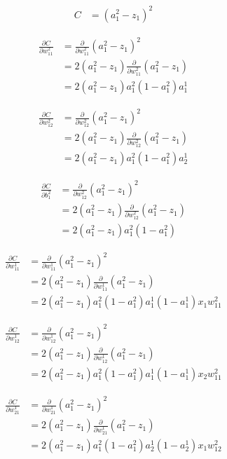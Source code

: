 \documentclass{article}
\begin{document}
\begin{align*}
C &= (a^2_1 - z_1)^2
\end{align*}

\begin{align*}
\frac{\partial C}{\partial w^2_{11}} &= \frac{\partial}{\partial w^2_{11}} (a^2_1 - z_1)^2\\
&= 2 (a^2_1 - z_1) \frac{\partial}{\partial w^2_{11}} (a^2_1 - z_1)\\
&= 2 (a^2_1 - z_1) a^2_1(1 - a^2_1)a^1_1
\end{align*}

\begin{align*}
\frac{\partial C}{\partial w^2_{12}} &= \frac{\partial}{\partial w^2_{12}} (a^2_1 - z_1)^2\\
&= 2 (a^2_1 - z_1) \frac{\partial}{\partial w^2_{12}} (a^2_1 - z_1)\\
&= 2 (a^2_1 - z_1) a^2_1(1 - a^2_1)a^1_2
\end{align*}

\begin{align*}
\frac{\partial C}{\partial b^2_{1}} &= \frac{\partial}{\partial w^2_{12}} (a^2_1 - z_1)^2\\
&= 2 (a^2_1 - z_1) \frac{\partial}{\partial w^2_{12}} (a^2_1 - z_1)\\
&= 2 (a^2_1 - z_1) a^2_1(1 - a^2_1)
\end{align*}

\begin{align*}
\frac{\partial C}{\partial w^1_{11}} &= \frac{\partial}{\partial w^1_{11}} (a^2_1 - z_1)^2\\
&= 2 (a^2_1 - z_1) \frac{\partial}{\partial w^1_{11}} (a^2_1 - z_1)\\
&= 2 (a^2_1 - z_1) a^2_1(1 - a^2_1)a^1_1(1 - a^1_1)x_1w^2_{11}
\end{align*}

\begin{align*}
\frac{\partial C}{\partial w^1_{12}} &= \frac{\partial}{\partial w^1_{12}} (a^2_1 - z_1)^2\\
&= 2 (a^2_1 - z_1) \frac{\partial}{\partial w^1_{12}} (a^2_1 - z_1)\\
&= 2 (a^2_1 - z_1) a^2_1(1 - a^2_1)a^1_1(1 - a^1_1)x_2w^2_{11}
\end{align*}

\begin{align*}
\frac{\partial C}{\partial w^1_{21}} &= \frac{\partial}{\partial w^1_{21}} (a^2_1 - z_1)^2\\
&= 2 (a^2_1 - z_1) \frac{\partial}{\partial w^1_{21}} (a^2_1 - z_1)\\
&= 2 (a^2_1 - z_1) a^2_1(1 - a^2_1)a^1_2(1 - a^1_2)x_1w^2_{12}
\end{align*}
\end{document}
